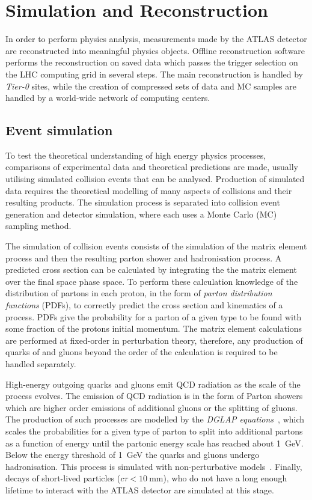 \chapter{Simulation and Reconstruction}\label{chap:SimReco}
In order to perform physics analysis, measurements made by the ATLAS detector are reconstructed into meaningful physics objects. Offline reconstruction software performs the reconstruction on saved data which passes the trigger selection on the LHC computing grid in several steps. The main reconstruction is handled by \emph{Tier-0} sites, while the creation of compressed sets of data and MC samples are handled by a world-wide network of computing centers.

\section{Event simulation}\label{sec:simulation}
To test the theoretical understanding of high energy physics processes, comparisons of experimental data and theoretical predictions are made, usually utilising simulated collision events that can be analysed. Production of simulated data requires the theoretical modelling of many aspects of \protonproton collisions and their resulting products. The simulation process is separated into collision event generation and detector simulation, where each uses a Monte Carlo (MC) sampling method. 

The simulation of collision events consists of the simulation of the matrix element process and then the resulting parton shower and hadronisation process. A predicted cross section can be calculated by integrating the the matrix element over the final space phase space. To perform these calculation knowledge of the distribution of partons in each proton, in the form of \emph{parton distribution functions} (PDFs), to correctly predict the cross section and kinematics of a process. PDFs give the probability for a parton of a given type to be found with some fraction of the protons initial momentum. The matrix element calculations are performed at fixed-order in perturbation theory, therefore, any production of quarks of and gluons beyond the order of the calculation is required to be handled separately. 

High-energy outgoing quarks and gluons emit QCD radiation as the scale of the process evolves. The emission of QCD radiation is in the form of Parton showers which are higher order emissions of additional gluons or the splitting of gluons. The production of such processes are modelled by the \emph{DGLAP equations}~\cite{Dokshitzer77,Gribov72,Altarelli77}, which scales the probabilities for a given type of parton to split into additional partons as a function of energy until the partonic energy scale has reached about \SI{1}{\giga\electronvolt}. Below the energy threshold of \SI{1}{\giga\electronvolt} the quarks and gluons undergo hadronisation. This process is simulated with non-perturbative models~\cite{Andersson1983,Webber1984}. Finally, decays of short-lived particles ($c\tau<\SI{10}{\milli\metre}$), who do not have a long enough lifetime to interact with the ATLAS detector are simulated at this stage. 


